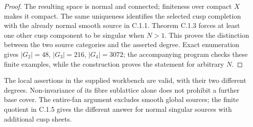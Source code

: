 \begin{proof}
The resulting space is normal and connected; finiteness over compact
$X$ makes it compact. The same uniqueness identifies the selected
cusp completion with the already normal smooth source in C.1.1.
Theorem C.1.3 forces at least one other cusp component to be singular
when $N>1$. This proves the distinction between the two source
categories and the asserted degree. Exact enumeration gives
$|G_2|=48$, $|G_3|=216$, $|G_4|=3072$; the accompanying program
checks these finite examples, while the construction proves the
statement for arbitrary $N$.
\end{proof}

The local assertions in the supplied workbench are valid, with their
two different degrees. Non-invariance of its fibre sublattice alone
does not prohibit a further base cover. The entire-fan argument excludes
smooth global sources; the finite quotient in C.1.5 gives the different
answer for normal singular sources with additional cusp sheets.
